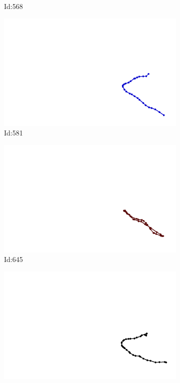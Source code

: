 \documentclass[12pt,twoside]{report}
\begin{document}
\begin{figure}
\begin{subfigure}[b]{0.20\textwidth}
\caption{Id:568}
\end{subfigure}
\begin{subfigure}[b]{0.20\textwidth}
\centering
\includegraphics[width=\textwidth]{../trajectories/581.png}
\caption{Id:581}
\end{subfigure}
\begin{subfigure}[b]{0.20\textwidth}
\centering
\includegraphics[width=\textwidth]{../trajectories/645.png}
\caption{Id:645}
\end{subfigure}
\begin{subfigure}[b]{0.20\textwidth}
\centering
\includegraphics[width=\textwidth]{../trajectories/710.png}

\end{subfigure}
\end{figure}
\end{document}
